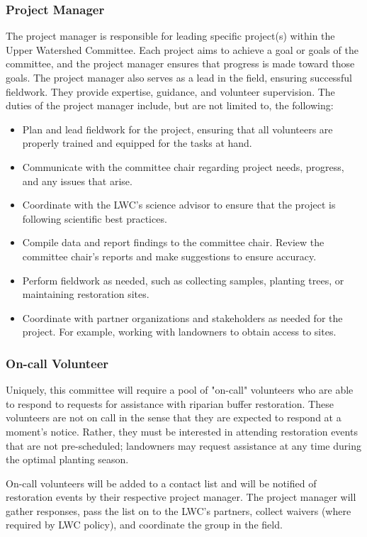 \documentclass[letterpaper,11pt,leqno]{article}
\begin{document}
\subsubsection{Project Manager}
The project manager is responsible for leading specific project(s) within the Upper Watershed Committee. Each project aims to achieve a goal or goals
of the committee, and the project manager ensures that progress is made toward those goals. The project manager also serves as a lead in the field,
ensuring successful fieldwork. They provide expertise, guidance, and volunteer supervision. The duties of the project manager include, but are not limited to, the following:
\begin{itemize}
\item Plan and lead fieldwork for the project, ensuring that all volunteers are properly trained and equipped for the tasks at hand.
\item Communicate with the committee chair regarding project needs, progress, and any issues that arise.
\item Coordinate with the LWC's science advisor to ensure that the project is following scientific best practices.
\item Compile data and report findings to the committee chair. Review the committee chair's reports and make suggestions to ensure accuracy.
\item Perform fieldwork as needed, such as collecting samples, planting trees, or maintaining restoration sites.
\item Coordinate with partner organizations and stakeholders as needed for the project. For example, working with landowners to obtain access to sites. 
\end{itemize}

\subsubsection{On-call Volunteer}
Uniquely, this committee will require a pool of "on-call" volunteers who are able to respond to requests for assistance with riparian buffer restoration.
These volunteers are not on call in the sense that they are expected to respond at a moment's notice. Rather, they must be interested in 
attending restoration events that are not pre-scheduled; landowners may request assistance at any time during the optimal planting season.

On-call volunteers will be added to a contact list and will be notified of restoration events by their respective project manager. The project manager will gather responses,
pass the list on to the LWC's partners, collect waivers (where required by LWC policy), and coordinate the group in the field.
\end{document}
